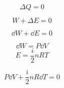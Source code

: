 
\begin{equation}
\Delta Q = 0
\end{equation}

\begin{equation}
W + \Delta E = 0
\end{equation}


\begin{equation}
\dd{W} + \dd{E} = 0
\end{equation}

\begin{equation}
\dd{W} = P\dd{V}
\end{equation}
\begin{equation}
E = \frac{i}{2}n RT
\end{equation}



\begin{equation}
P\dd{V} + \frac{i}{2}nR\dd{T} = 0
\end{equation}




